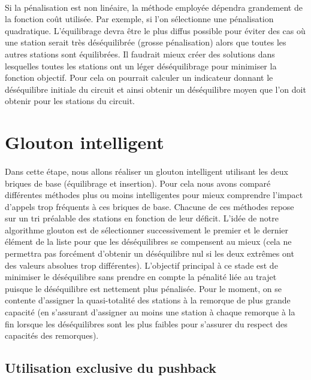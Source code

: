 \documentclass[a4paper, 11pt]{article} %
\begin{document}
\paragraph*{}
Si la pénalisation est non linéaire, la méthode employée dépendra grandement de la fonction coût utilisée. Par exemple, si l'on sélectionne une pénalisation quadratique. L'équilibrage devra être le plus diffus possible pour éviter des cas où une station serait très déséquilibrée (grosse pénalisation) alors que toutes les autres stations sont équilibrées. Il faudrait mieux créer des solutions dans lesquelles toutes les stations ont un léger déséquilibrage pour minimiser la fonction objectif. Pour cela on pourrait calculer un indicateur donnant le déséquilibre initiale du circuit et ainsi obtenir un déséquilibre moyen que l'on doit obtenir pour les stations du circuit.

\section{Glouton intelligent}

\paragraph*{}
Dans cette étape, nous allons réaliser un glouton intelligent utilisant les deux briques de base (équilibrage et insertion). Pour cela nous avons comparé différentes méthodes plus ou moins intelligentes pour mieux comprendre l'impact d'appels trop fréquents à ces briques de base. Chacune de ces méthodes repose sur un tri préalable des stations en fonction de leur déficit. L'idée de notre algorithme glouton est de sélectionner successivement le premier et le dernier élément de la liste pour que les déséquilibres se compensent au mieux (cela ne permettra pas forcément d'obtenir un déséquilibre nul si les deux extrêmes ont des valeurs absolues trop différentes). L'objectif principal à ce stade est de minimiser le déséquilibre sans prendre en compte la pénalité liée au trajet puisque le déséquilibre est nettement plus pénalisée. Pour le moment, on se contente d'assigner la quasi-totalité des stations à la remorque de plus grande capacité (en s'assurant d'assigner au moins une station à chaque remorque à la fin lorsque les déséquilibres sont les plus faibles pour s'assurer du respect des capacités des remorques).

\subsection{Utilisation exclusive du pushback}
\end{document}
